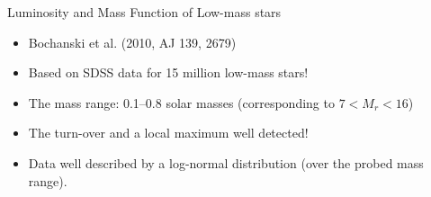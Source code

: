 \documentclass[letterpaper,landscape]{slides}
\begin{document}
\begin{slide}
{\begin{minipage}[t]{12cm}
\begin{center}
\vskip 0.1in
{\large \color{red} \phantom{x} Luminosity and Mass Function of Low-mass stars}
\end{center}

\begin{itemize}
\item Bochanski et al. (2010, AJ 139, 2679)
\item Based on SDSS data for 15 million low-mass stars! 
\item The mass range: 0.1--0.8 solar masses (corresponding to $7 < M_r < 16$)
\item The turn-over and a local maximum well detected! 
\item Data well described by a log-normal distribution (over the probed mass range). 
\end{itemize}  

\end{minipage}}
\vfill 
\end{slide}
\end{document}
